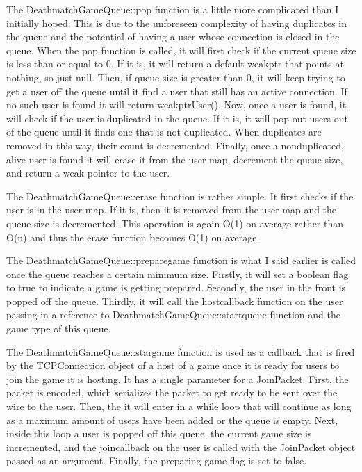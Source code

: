 \documentclass[conference]{IEEEtran}
\begin{document}
The DeathmatchGameQueue::pop function is a little more complicated than I initially hoped.
This is due to the unforeseen complexity of having duplicates in the queue and the potential of having a user whose connection is closed in the queue.
When the pop function is called, it will first check if the current queue size is less than or equal to 0.
If it is, it will return a default weak\textunderscore ptr that points at nothing, so just null.
Then, if queue size is greater than 0, it will keep trying to get a user off the queue until it find a user that still has an active connection.
If no such user is found it will return weak\textunderscore ptr\textlangle User\textrangle ().
Now, once a user is found, it will check if the user is duplicated in the queue.
If it is, it will pop out users out of the queue until it finds one that is not duplicated.
When duplicates are removed in this way, their count is decremented.
Finally, once a nonduplicated, alive user is found it will erase it from the user map, decrement the queue size, and return a weak pointer to the user.

The DeathmatchGameQueue::erase function is rather simple.
It first checks if the user is in the user map.
If it is, then it is removed from the user map and the queue size is decremented.
This operation is again O(1) on average rather than O(n) and thus the erase function becomes O(1) on average.

The DeathmatchGameQueue::prepare\textunderscore game function is what I said earlier is called once the queue reaches a certain minimum size.
Firstly, it will set a boolean flag to true to indicate a game is getting prepared.
Secondly, the user in the front is popped off the queue.
Thirdly, it will call the host\textunderscore callback function on the user passing in a reference to DeathmatchGameQueue::start\textunderscore queue function and the game type of this queue.

The DeathmatchGameQueue::star\textunderscore game function is used as a callback that is fired by the TCPConnection object of a host of a game once it is ready for users to join the game it is hosting.
It has a single parameter for a JoinPacket.
First, the packet is encoded, which serializes the packet to get ready to be sent over the wire to the user.
Then, the it will enter in a while loop that will continue as long as a maximum amount of users have been added or the queue is empty.
Next, inside this loop a user is popped off this queue, the current game size is incremented, and the join\textunderscore callback on the user is called with the JoinPacket object passed as an argument.
Finally, the preparing game flag is set to false.
\end{document}
